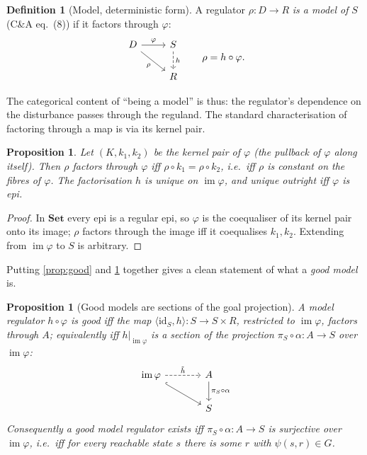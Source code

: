 \documentclass[11pt,a4paper]{article}
\newtheorem{proposition}[theorem]{Proposition}
\theoremstyle{definition}
\newtheorem{definition}[theorem]{Definition}
\theoremstyle{remark}
\newcommand{\Set}{\mathbf{Set}}
\newcommand{\id}{\mathrm{id}}
\newcommand{\im}{\operatorname{im}}
\newcommand{\pair}[2]{\langle #1,#2\rangle}
\begin{document}
\begin{definition}[Model, deterministic form]\label{def:relmodel}
A regulator $\rho\colon D\to R$ \emph{is a model of} $S$ (C\&A eq.\ (8)) if it factors through $\varphi$:
\[
\begin{tikzcd}
D \arrow[r,"\varphi"] \arrow[dr,"\rho"'] & S \arrow[d,dashed,"h"] \\ & R
\end{tikzcd}
\qquad \rho=h\circ\varphi .
\]
\end{definition}

The categorical content of ``being a model'' is thus: the regulator's dependence
on the disturbance passes through the reguland. The standard characterisation of
factoring through a map is via its kernel pair.

\begin{proposition}\label{prop:kernelpair}
Let $(K,k_1,k_2)$ be the kernel pair of $\varphi$ (the pullback of $\varphi$ along itself). Then $\rho$ factors through $\varphi$ iff $\rho\circ k_1=\rho\circ k_2$, i.e.\ iff $\rho$ is constant on the fibres of $\varphi$. The factorisation $h$ is unique on $\im\varphi$, and unique outright iff $\varphi$ is epi.
\end{proposition}
\begin{proof}
In $\Set$ every epi is a regular epi, so $\varphi$ is the coequaliser of its kernel pair onto its image; $\rho$ factors through the image iff it coequalises $k_1,k_2$. Extending from $\im\varphi$ to $S$ is arbitrary.
\end{proof}

Putting \ref{prop:good} and \ref{def:relmodel} together gives a clean statement
of what a \emph{good model} is.

\begin{proposition}[Good models are sections of the goal projection]\label{prop:section}
A model regulator $h\circ\varphi$ is good iff the map $\pair{\id_S}{h}\colon S\to S\times R$, restricted to $\im\varphi$, factors through $A$; equivalently iff $h|_{\im\varphi}$ is a section of the projection $\pi_S\circ\alpha\colon A\to S$ over $\im\varphi$:
\[
\begin{tikzcd}[column sep=large]
\im\varphi \arrow[r,dashed,"\tilde h"] \arrow[dr,hook] & A \arrow[d,"\pi_S\circ\alpha"] \\ & S
\end{tikzcd}
\]
Consequently a good model regulator exists iff $\pi_S\circ\alpha\colon A\to S$ is surjective over $\im\varphi$, i.e.\ iff for every reachable state $s$ there is some $r$ with $\psi(s,r)\in G$.
\end{proposition}
\end{document}

